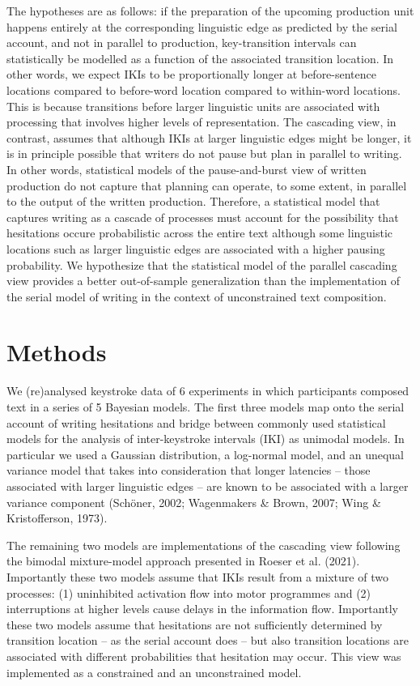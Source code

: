 \documentclass[
  english,
  man,floatsintext]{apa7}
\begin{document}
The hypotheses are as follows: if the preparation of the upcoming production unit happens entirely at the corresponding linguistic edge as predicted by the serial account, and not in parallel to production, key-transition intervals can statistically be modelled as a function of the associated transition location. In other words, we expect IKIs to be proportionally longer at before-sentence locations compared to before-word location compared to within-word locations. This is because transitions before larger linguistic units are associated with processing that involves higher levels of representation. The cascading view, in contrast, assumes that although IKIs at larger linguistic edges might be longer, it is in principle possible that writers do not pause but plan in parallel to writing. In other words, statistical models of the pause-and-burst view of written production do not capture that planning can operate, to some extent, in parallel to the output of the written production. Therefore, a statistical model that captures writing as a cascade of processes must account for the possibility that hesitations occure probabilistic across the entire text although some linguistic locations such as larger linguistic edges are associated with a higher pausing probability. We hypothesize that the statistical model of the parallel cascading view provides a better out-of-sample generalization than the implementation of the serial model of writing in the context of unconstrained text composition.

\hypertarget{methods}{%
\section{Methods}\label{methods}}

We (re)analysed keystroke data of 6 experiments in which participants composed text in a series of 5 Bayesian models. The first three models map onto the serial account of writing hesitations and bridge between commonly used statistical models for the analysis of inter-keystroke intervals (IKI) as unimodal models. In particular we used a Gaussian distribution, a log-normal model, and an unequal variance model that takes into consideration that longer latencies -- those associated with larger linguistic edges -- are known to be associated with a larger variance component (Schöner, 2002; Wagenmakers \& Brown, 2007; Wing \& Kristofferson, 1973).

The remaining two models are implementations of the cascading view following the bimodal mixture-model approach presented in Roeser et al. (2021). Importantly these two models assume that IKIs result from a mixture of two processes: (1) uninhibited activation flow into motor programmes and (2) interruptions at higher levels cause delays in the information flow. Importantly these two models assume that hesitations are not sufficiently determined by transition location -- as the serial account does -- but also transition locations are associated with different probabilities that hesitation may occur. This view was implemented as a constrained and an unconstrained model.
\end{document}
